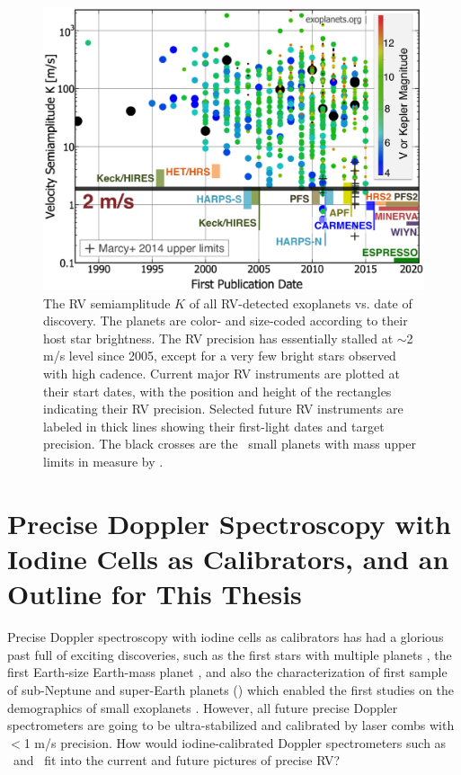 \begin{figure}
\centering
\includegraphics[scale=0.32]{introduction/family-big-carmenes.eps}
\caption{The RV semiamplitude $K$ of all RV-detected exoplanets
  vs. date of discovery. The planets are color- and size-coded according
  to their host star brightness. The RV precision has essentially
  stalled at $\sim$2 m/s level since 2005, except for a very few bright
  stars observed with high cadence. Current major RV instruments are
  plotted at their start dates, with the position and height of the
  rectangles indicating their RV precision. Selected future RV
  instruments are labeled in thick lines showing their first-light dates
  and target precision. The black crosses are the \kepler\ small planets
  with mass upper limits in \cite{marcy2014} measure by \keck.
\label{intro:fig:family}}
\end{figure}



\section{Precise Doppler Spectroscopy with Iodine Cells as
  Calibrators, and an Outline for This Thesis} 

Precise Doppler spectroscopy with iodine cells as calibrators has had
a glorious past full of exciting discoveries, such as the first stars
with multiple planets \citep{butler1999}, the first Earth-size
Earth-mass planet \cite{howard2013, pepe2013}, and also the
characterization of first sample of sub-Neptune and super-Earth
planets (\citealt{marcy2014}) which enabled the first studies on the
demographics of small exoplanets
\citep{wu2013, weiss2014, rogers2015, wolfgang2015a, wolfgang2015b}. However,
all future precise Doppler spectrometers are going to be
ultra-stabilized and calibrated by laser combs with $<$1 m/s
precision. How would iodine-calibrated Doppler spectrometers such as
\het\ and \keck\ fit into the current and future pictures of precise
RV?

